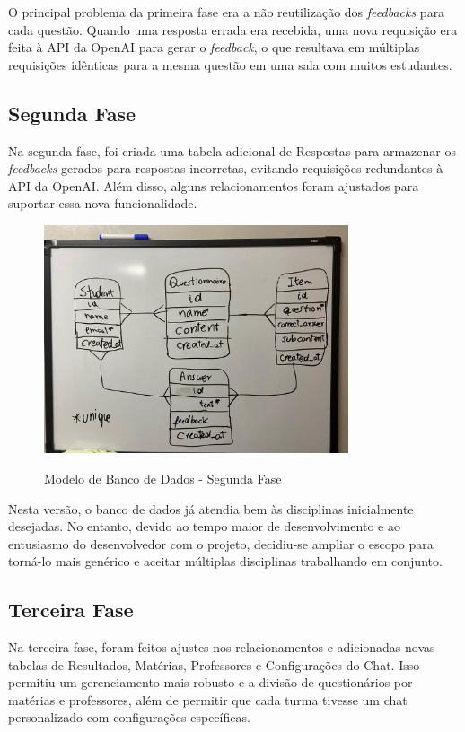 O principal problema da primeira fase era a não reutilização dos \textit{feedbacks} para cada questão. Quando uma resposta errada era recebida, uma nova requisição era feita à API da OpenAI para gerar o \textit{feedback}, o que resultava em múltiplas requisições idênticas para a mesma questão em uma sala com muitos estudantes.

\subsection{Segunda Fase}

Na segunda fase, foi criada uma tabela adicional de Respostas para armazenar os \textit{feedbacks} gerados para respostas incorretas, evitando requisições redundantes à API da OpenAI. Além disso, alguns relacionamentos foram ajustados para suportar essa nova funcionalidade.

\begin{figure}[H]
    \centering
    \caption{Modelo de Banco de Dados - Segunda Fase}
    \includegraphics[width=0.8\textwidth]{figuras/bd-phase2.jpeg}
    \label{fig:second_phase}
\end{figure}

Nesta versão, o banco de dados já atendia bem às disciplinas inicialmente desejadas. No entanto, devido ao tempo maior de desenvolvimento e ao entusiasmo do desenvolvedor com o projeto, decidiu-se ampliar o escopo para torná-lo mais genérico e aceitar múltiplas disciplinas trabalhando em conjunto.

\subsection{Terceira Fase}

Na terceira fase, foram feitos ajustes nos relacionamentos e adicionadas novas tabelas de Resultados, Matérias, Professores e Configurações do Chat. Isso permitiu um gerenciamento mais robusto e a divisão de questionários por matérias e professores, além de permitir que cada turma tivesse um chat personalizado com configurações específicas.

